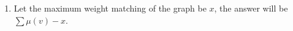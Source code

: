 \begin{itemize}
\begin{enumerate}
      \item Let the maximum weight matching of the graph be $x$, the answer will be $\sum \mu(v) - x$.
    \end{enumerate}
\end{itemize}